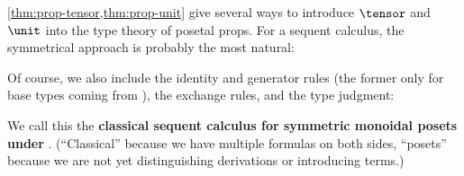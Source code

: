\cref{thm:prop-tensor,thm:prop-unit} give several ways to introduce $\tensor$ and $\unit$ into the type theory of posetal props.
For a sequent calculus, the symmetrical approach is probably the most natural:
Of course, we also include the identity and generator rules (the former only for base types coming from \cG), the exchange rules, and the type judgment:
We call this the \textbf{classical sequent calculus for symmetric monoidal posets under \cG}.
(``Classical'' because we have multiple formulas on both sides, ``posets'' because we are not yet distinguishing derivations or introducing terms.)

